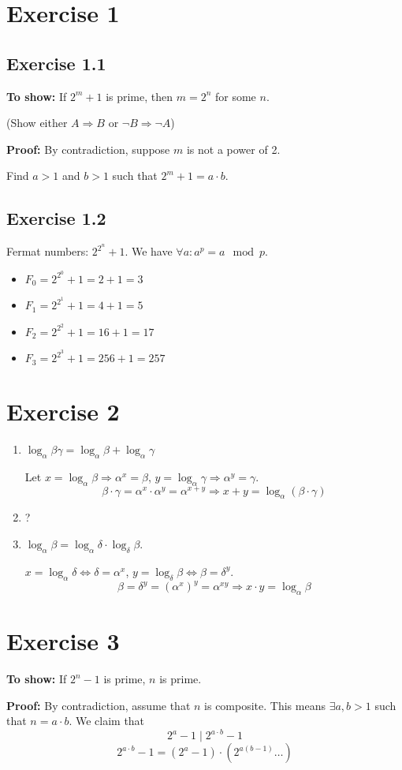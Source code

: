 \documentclass[a4paper]{scrreprt}
\begin{document}
\section*{Exercise 1}
\subsection*{Exercise 1.1}

\textbf{To show:} If $2^m+1$ is prime, then $m=2^n$ for some $n$.

(Show either $A\Rightarrow B$ or $\neg B\Rightarrow\neg A$)

\textbf{Proof:} By contradiction, suppose $m$ is not a power of 2.

Find $a>1$ and $b>1$ such that $2^m+1=a\cdot b$.

\subsection*{Exercise 1.2}

Fermat numbers: $2^{2^n}+1$. We have $\forall a: a^p=a\mod p$.
\begin{itemize}
    \item $F_0=2^{2^0}+1=2+1=3$
    \item $F_1=2^{2^1}+1=4+1=5$
    \item $F_2=2^{2^2}+1=16+1=17$
    \item $F_3=2^{2^3}+1=256+1=257$
\end{itemize}

\section*{Exercise 2}
\begin{enumerate}[label=\alph*)]
    \item $\log_\alpha\beta\gamma = \log_\alpha\beta+\log_\alpha\gamma$

        Let $x=\log_\alpha\beta \Rightarrow \alpha^x=\beta$,
        $y=\log_\alpha\gamma\Rightarrow\alpha^y=\gamma$.
        \[\beta\cdot\gamma=\alpha^x\cdot\alpha^y=\alpha^{x+y}\Rightarrow x+y
            =\log_\alpha(\beta\cdot\gamma)\]
    \item ?
    \item $\log_\alpha\beta=\log_\alpha\delta\cdot\log_\delta\beta$.

        $x=\log_\alpha\delta \Leftrightarrow \delta=\alpha^x$,
        $y=\log_\delta\beta \Leftrightarrow \beta=\delta^y$.
        \[\beta=\delta^y=\left(\alpha^x\right)^y=\alpha^{xy}\Rightarrow x\cdot y=\log_\alpha\beta\]
\end{enumerate}

\section*{Exercise 3}

\textbf{To show:} If $2^n-1$ is prime, $n$ is prime.

\textbf{Proof:} By contradiction, assume that $n$ is composite. This means $\exists a,b>1$ such that
$n=a\cdot b$. We claim that \[2^a-1\mid 2^{a\cdot b}-1\]
\[2^{a\cdot b}-1=(2^a-1)\cdot \left(2^{a(b-1)} \hdots\right)\]
\end{document}
